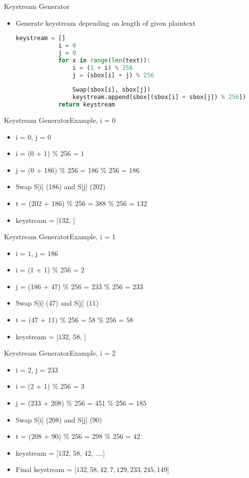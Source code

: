 \documentclass[
	aspectratio=169,	%
	onlytextwidth,		%
	t,					%
	]{beamer}
\begin{document}
\begin{frame}[fragile]{Keystream Generator}
	\begin{itemize}
		\item Generate keystream depending on length of given plaintext
		\begin{lstlisting}[language=Python]
			keystream = []
			i = 0
			j = 0
			for x in range(len(text)):
				i = (1 + i) % 256
				j = (sbox[i] + j) % 256
				
				Swap(sbox[i], sbox[j])
				keystream.append(sbox[(sbox[i] + sbox[j]) % 256])    
			return keystream   
		\end{lstlisting}
	\end{itemize}
\end{frame}

\begin{frame}[fragile]{Keystream Generator}{Example, i = 0}
	\begin{itemize}
		\item i = $0$, j = $0$
		\item i = (0 + 1) $\%$ 256 = $1$
		\item j = (0 + 186) $\%$ 256 = 186 $\%$ 256 = $186$
		\item Swap S[i] (186) and S[j] (202)
		\item t = (202 + 186) $\%$ 256 = 388 $\%$ 256 = $132$
		\item keystream = [$132$, ]
	\end{itemize}
\end{frame}

\begin{frame}[fragile]{Keystream Generator}{Example, i = 1}
	\begin{itemize}
		\item i = $1$, j = $186$
		\item i = (1 + 1) $\%$ 256 = $2$
		\item j = (186 + 47) $\%$ 256 = 233 $\%$ 256 = $233$
		\item Swap S[i] (47) and S[j] (11)
		\item t = (47 + 11) $\%$ 256 = 58 $\%$ 256 = $58$
		\item keystream = [$132$, $58$, ]
	\end{itemize}
\end{frame}

\begin{frame}[fragile]{Keystream Generator}{Example, i = 2}
	\begin{itemize}
		\item i = $2$, j = $233$
		\item i = (2 + 1) $\%$ 256 = $3$
		\item j = (233 + 208) $\%$ 256 = 451 $\%$ 256 = $185$
		\item Swap S[i] (208) and S[j] (90)
		\item t = (208 + 90) $\%$ 256 = 298 $\%$ 256 = $42$
		\item keystream = [$132$, $58$, $42$, ....]
		\item Final keystream = [$132, 58, 42, 7, 129, 233, 245, 149$]
	\end{itemize}
\end{frame}
\end{document}

